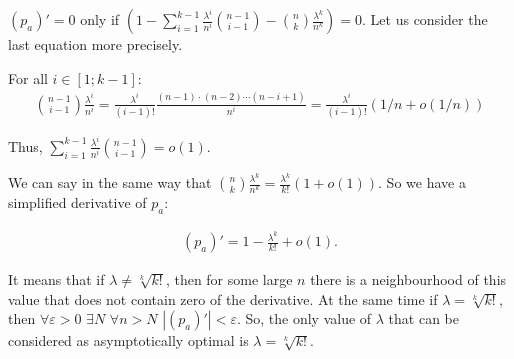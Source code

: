 \documentclass{article}
\begin{document}
$(p_a)' = 0$ only if $\left(1 - \sum\limits_{i = 1}^{k - 1} \frac{\lambda^i}{n^i} \binom{n - 1}{i - 1} - \binom{n}{k} \frac{\lambda^k}{n^k} \right) = 0$. Let us consider the last equation more precisely.

For all $i \in [1; k - 1]:$
\begin{align*}
  \binom{n - 1}{i - 1}\frac{\lambda^i}{n^i} = \frac{\lambda^i}{(i - 1)!} \frac{(n - 1)\cdot(n - 2)\cdots(n - i + 1)}{n^i} = \frac{\lambda^i}{(i - 1)!} (1/n + o(1/n))
\end{align*}

Thus, $\sum\limits_{i = 1}^{k - 1} \frac{\lambda^i}{n^i} \binom{n - 1}{i - 1} = o(1).$

We can say in the same way that $\binom{n}{k} \frac{\lambda^k}{n^k} = \frac{\lambda^k}{k!} (1 + o(1))$. So we have a simplified derivative of $p_a:$

\begin{align*}
(p_a)' = 1 - \frac{\lambda^k}{k!} + o(1).
\end{align*}

It means that if $\lambda \ne \sqrt[k]{k!}$, then for some large $n$ there is a neighbourhood of this value that does not contain zero of the derivative. At the same time if $\lambda = \sqrt[k]{k!}$, then $\forall \varepsilon > 0$ $\exists N$ $\forall n > N$ $|(p_a)'| < \varepsilon$. So, the only value of $\lambda$ that can be considered as asymptotically optimal is $\lambda = \sqrt[k]{k!}$.
\end{document}
